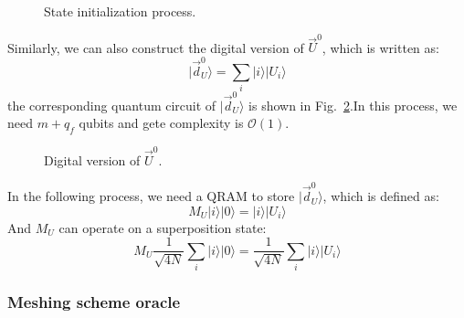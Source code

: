 \documentclass[%
 reprint,
 amsmath,amssymb,
pra,
]{revtex4-1}
\begin{document}
\begin{figure}[htbp]
    \caption{State initialization process.  }
    \label{state_initialization}
\end{figure}
Similarly, we can also construct the digital version of $\vec{U}^0$, which is written as:
\begin{equation}
|\vec{d}_U^0\rangle=\sum_i{|i\rangle|U_i\rangle}
\end{equation}
the corresponding quantum circuit of $|\vec{d}_U^0\rangle$ is shown in Fig.~\ref{digit_state_initialization}.In this process, we need $m+q_f$ qubits and gete complexity is $\mathcal{O}(1)$.

\begin{figure}[htbp]
    \caption{Digital version of $\vec{U}^0$. }
    \label{digit_state_initialization}
\end{figure}

In the following process, we need a QRAM to store $|\vec{d}_U^0\rangle$, which is defined as:
\begin{equation}
M_U|i\rangle|0\rangle=|i\rangle|U_i\rangle
\end{equation}
And $M_U$ can operate on a superposition state:
\begin{equation}
M_U\frac{1}{\sqrt{4N}}\sum_i{|i\rangle|0\rangle}=\frac{1}{\sqrt{4N}}\sum_i{|i\rangle|U_i\rangle}
\end{equation}

\subsubsection{Meshing scheme oracle}
\end{document}

